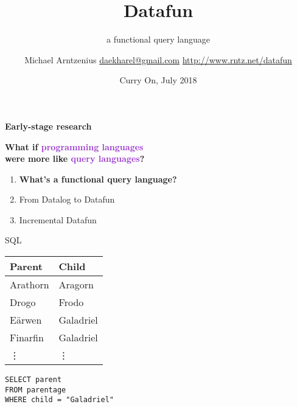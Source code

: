 \documentclass[xcolor=table,usenames,dvipsnames,svgnames]{beamer}
\title{Datafun}
\subtitle{a functional query language}
\author{\texorpdfstring{Michael Arntzenius\newline
  \href{mailto:daekharel@gmail.com}{daekharel@gmail.com}\newline
  \url{http://www.rntz.net/datafun}}{Michael Arntzenius}}
\date{Curry On, July 2018}
\begin{document}
\maketitle


\begin{frame}\centering\LARGE\bf Early-stage research \end{frame}

\begin{frame}\LARGE \centering
  \textbf{What if \textcolor{DarkOrchid}{programming languages}\\
    were more like \textcolor{DarkOrchid}{query languages}?}


\end{frame}


\begin{frame}\Large
  \begin{enumerate}
    \itemsep 1.5em
  \item {\bf What's a functional query language?}
  \item From Datalog to Datafun
  \item Incremental Datafun
  \end{enumerate}
\end{frame}


\begin{frame}{SQL}\large
  \begin{minipage}{0.4\textwidth}
    \centering
    \begin{tabular}{ll}
      \textbf{Parent} & \textbf{Child}\\\midrule
      Arathorn & Aragorn\\
      Drogo & Frodo\\
      E\"arwen & Galadriel\\
      Finarfin & Galadriel\\
      \hfill\vdots & \hfill\vdots
    \end{tabular}
  \end{minipage}
  \hfill
  \begin{minipage}{0.53\textwidth}
    \texttt{SELECT parent\\FROM parentage\\WHERE child = "Galadriel"}
  \end{minipage}
\end{frame}
\end{document}

